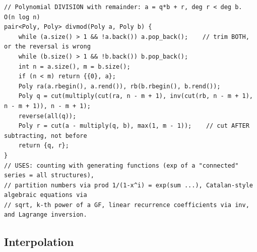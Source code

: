 \documentclass[9pt,a4paper,twocolumn]{extarticle}
\begin{document}
\begin{lstlisting}
// Polynomial DIVISION with remainder: a = q*b + r, deg r < deg b.  O(n log n)
pair<Poly, Poly> divmod(Poly a, Poly b) {
    while (a.size() > 1 && !a.back()) a.pop_back();    // trim BOTH, or the reversal is wrong
    while (b.size() > 1 && !b.back()) b.pop_back();
    int n = a.size(), m = b.size();
    if (n < m) return {{0}, a};
    Poly ra(a.rbegin(), a.rend()), rb(b.rbegin(), b.rend());
    Poly q = cut(multiply(cut(ra, n - m + 1), inv(cut(rb, n - m + 1), n - m + 1)), n - m + 1);
    reverse(all(q));
    Poly r = cut(a - multiply(q, b), max(1, m - 1));    // cut AFTER subtracting, not before
    return {q, r};
}
// USES: counting with generating functions (exp of a "connected" series = all structures),
// partition numbers via prod 1/(1-x^i) = exp(sum ...), Catalan-style algebraic equations via
// sqrt, k-th power of a GF, linear recurrence coefficients via inv, and Lagrange inversion.
\end{lstlisting}

\subsection{Interpolation}

\filbreak
\end{document}

